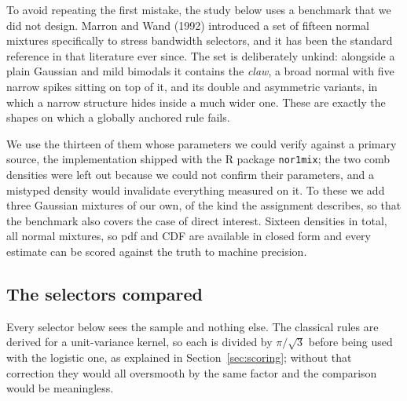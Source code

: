 \documentclass[11pt]{article}
\begin{document}
To avoid repeating the first mistake, the study below uses a benchmark that we did not
design. Marron and Wand (1992) introduced a set of fifteen normal mixtures specifically to
stress bandwidth selectors, and it has been the standard reference in that literature ever
since. The set is deliberately unkind: alongside a plain Gaussian and mild bimodals it
contains the \emph{claw}, a broad normal with five narrow spikes sitting on top of it, and
its double and asymmetric variants, in which a narrow structure hides inside a much wider
one. These are exactly the shapes on which a globally anchored rule fails.

We use the thirteen of them whose parameters we could verify against a primary source, the
implementation shipped with the R package \texttt{nor1mix}; the two comb densities were left
out because we could not confirm their parameters, and a mistyped density would invalidate
everything measured on it. To these we add three Gaussian mixtures of our own, of the kind
the assignment describes, so that the benchmark also covers the case of direct interest.
Sixteen densities in total, all normal mixtures, so pdf and CDF are available in
closed form and every estimate can be scored against the truth to machine precision.

\subsection{The selectors compared}

Every selector below sees the sample and nothing else. The classical rules are derived for a
unit-variance kernel, so each is divided by $\pi/\sqrt3$ before being used with the logistic
one, as explained in Section~\ref{sec:scoring}; without that correction they would all
oversmooth by the same factor and the comparison would be meaningless.
\end{document}
